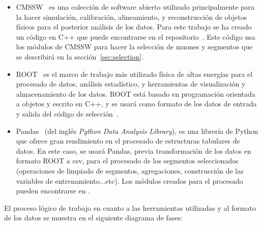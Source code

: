 \begin{itemize}

\item CMSSW~\cite{cmssw} es una colecci\'on de software abierto utilizado principalmente para la hacer simulaci\'on, calibraci\'on, alineamiento, y reconstrucci\'on de objetos f\'isicos para el posterior an\'alisis de los datos. Para este trabajo se ha creado un c\'odigo en C++ que puede encontrarse en el repositorio~\cite{analyzer}. Este c\'odigo usa los m\'odulos de CMSSW para hacer la selecci\'on de muones y segmentos que se describir\'a en la secci\'on~\ref{sec:selection}. 

\item ROOT~\cite{root} es el marco de trabajo m\'as utilizado f\'isica de altas energ\'ias para el procesado de datos, an\'alisis estad\'istico, y herramientas de visualizaci\'on y almacenamiento de los datos. ROOT est\'a basado en programaci\'on orientada a objetos y escrito en C++, y se usar\'a como formato de los datos de entrada y salida del c\'odigo de selecci\'on~\cite{analyzer}.

\item Pandas~\cite{mckinney-proc-scipy-2010} (del ingl\'es \textit{Python Data Analysis Library}), es una librer\'ia de Python que ofrece gran rendimiento en el procesado de estructuras tabulares de datos. En este caso, se usar\'a Pandas, previa transformaci\'on de los datos en formato ROOT a csv, para el procesado de los segmentos seleccionados (operaciones de limpiado de segmentos, agregaciones, construcci\'on de las variables de entrenamiento...etc). Los m\'odulos creados para el procesado pueden encontrarse en \cite{processor}.

\end{itemize}


El proceso l\'ogico de trabajo en cuanto a las herramientas utilizadas y al formato de los datos se muestra en el siguiente diagrama de fases: 

\begin{center}
\end{center}


